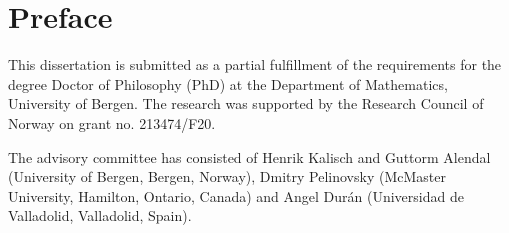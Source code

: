 \chapter{Preface}

This dissertation is submitted as a partial fulfillment of the requirements for the degree Doctor of Philosophy (PhD) at the Department of Mathematics, University of Bergen. The research was
supported by the Research Council of Norway on grant no. 213474/F20. 




The advisory committee has consisted of Henrik Kalisch and Guttorm Alendal (University of Bergen, Bergen, Norway),  Dmitry Pelinovsky (McMaster University, Hamilton, Ontario, Canada) and Angel Dur\'an (Universidad de Valladolid, Valladolid, Spain).


